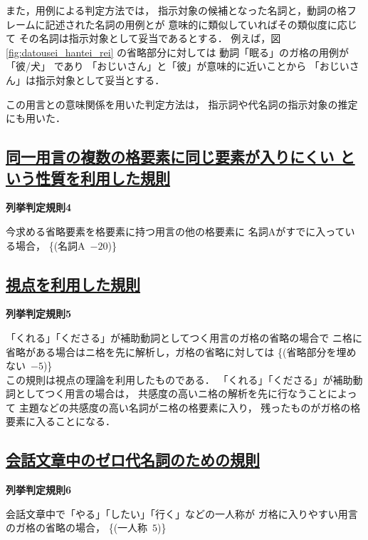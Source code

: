 また，用例による判定方法では，
指示対象の候補となった名詞と，動詞の格フレームに記述された名詞の用例とが
意味的に類似していればその類似度に応じて
その名詞は指示対象として妥当であるとする．
例えば，図\ref{fig:datousei_hantei_rei} の省略部分に対しては
動詞「眠る」のガ格の用例が「彼/犬」
であり
「おじいさん」と「彼」が意味的に近いことから
「おじいさん」は指示対象として妥当とする．

この用言との意味関係を用いた判定方法は，
指示詞や代名詞の指示対象の推定にも用いた．

\subsection*{\underline{同一用言の複数の格要素に同じ要素が入りにくい
という性質を利用した規則}}


\noindent
{\bf 列挙判定規則4}
\begin{indention}{0.8cm}\noindent
  今求める省略要素を格要素に持つ用言の他の格要素に
  名詞Aがすでに入っている場合，
  \{(名詞A \,$-20$)\}
\end{indention}

\subsection*{\underline{視点を利用した規則}}


\noindent
{\bf 列挙判定規則5}
\begin{indention}{0.8cm}\noindent
  「くれる」「くださる」が補助動詞としてつく用言のガ格の省略の場合で
  ニ格に省略がある場合はニ格を先に解析し，ガ格の省略に対しては
  \{(省略部分を埋めない \,$-5$)\}\\
  この規則は視点の理論\cite{kameyama1}を利用したものである．
  「くれる」「くださる」が補助動詞としてつく用言の場合は，
  共感度の高いニ格の解析を先に行なうことによって
  主題などの共感度の高い名詞がニ格の格要素に入り，
  残ったものがガ格の格要素に入ることになる．
\end{indention}

\subsection*{\underline{会話文章中のゼロ代名詞のための規則}}


\noindent
{\bf 列挙判定規則6}
\begin{indention}{0.8cm}\noindent
会話文章中で「やる」「したい」「行く」などの一人称が
ガ格に入りやすい用言のガ格の省略の場合，
\{(一人称 \,$5$)\}
\end{indention}

